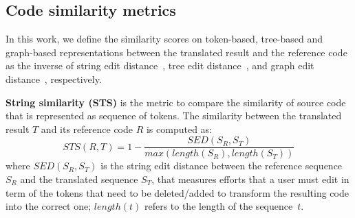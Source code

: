 \subsection{Code similarity metrics}

In this work, we define the similarity scores on token-based,
tree-based and graph-based representations between the translated
result and the reference code as the inverse of string edit
distance~\cite{levenshtein}, tree edit distance~\cite{oopsla10}, and graph edit
distance~\cite{sanfeliu}, respectively.

\textbf{String similarity (STS)} is the metric to compare the
similarity of source code that is represented as sequence of
tokens. The similarity between the translated result $T$ and its
reference code $R$ is computed as:
$$STS(R, T) = 1 - \frac{SED(S_R, S_T)}{max\left(length(S_R), length(S_T)\right)}$$
where $SED(S_R, S_T)$ is the string edit distance between the
reference sequence $S_R$ and the translated sequence $S_T$, that
measures efforts that a user must edit in term of the tokens that need
to be deleted/added to transform the resulting code into the correct one;
$length(t)$ refers to the length of the sequence~$t$.



